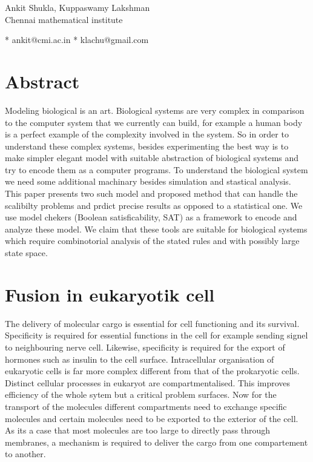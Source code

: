 \documentclass[preprint,12pt]{elsarticle}
\begin{document}
\vspace*{0.2in}

\begin{flushleft}
{\Large
\textbf{}}

Ankit Shukla, Kuppaswamy Lakshman 
\\
\bigskip
Chennai mathematical institute
\bigskip

* ankit@cmi.ac.in
* klachu@gmail.com
\end{flushleft}

\section*{Abstract}
Modeling biological is an art. Biological systems are very complex in comparison to the computer system that we currently can build, for example a human body is a perfect example of the complexity involved in the system. So in order to understand these complex systems, besides experimenting the best way is to make simpler elegant model with suitable abstraction of biological systems and try to encode them as a computer programs. To understand the biological system we need some additional machinary besides simulation and stastical analysis. This paper presents two such model and proposed method that can handle the scalibilty problems and prdict precise results as opposed to a statistical one. We use model chekers (Boolean satisficability, SAT) as a framework to encode and analyze these model. We claim that these tools are suitable for biological systems which require combinotorial analysis of the stated rules and with possibly large state space.

\section{Fusion in eukaryotik cell}
The delivery of molecular cargo is essential for cell functioning and its survival. Specificity is required for essential functions in the cell for example sending signel to neighbouring nerve cell. Likewise, specificity is required for the export of hormones such as insulin to the cell surface. Intracellular organisation of eukaryotic cells is far more complex different from that of the prokaryotic cells. Distinct cellular processes in eukaryot are compartmentalised. This improves efficiency of the whole sytem but a critical problem surfaces. Now for the transport of the molecules different compartments need to exchange specific molecules and certain molecules need to be exported to the exterior of the cell. As its a case that most molecules are too large to directly pass through membranes, a mechanism is required to deliver the cargo from one compartement to another.
\end{document}
